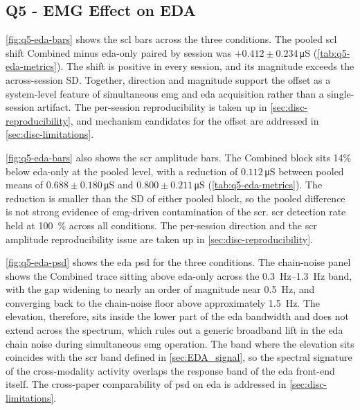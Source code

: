 \subsection{Q5 - EMG Effect on EDA}
\label{sec:disc-q5}

\autoref{fig:q5-eda-bars} shows the \gls{scl} bars across the three conditions. The pooled \gls{scl} shift Combined minus \gls{eda}-only paired by session was $+\num{0.412} \pm \num{0.234}$\,\si{\micro\siemens} (\autoref{tab:q5-eda-metrics}). The shift is positive in every session, and its magnitude exceeds the across-session SD. Together, direction and magnitude support the offset as a system-level feature of simultaneous \gls{emg} and \gls{eda} acquisition rather than a single-session artifact. The per-session reproducibility is taken up in \autoref{sec:disc-reproducibility}, and mechanism candidates for the offset are addressed in \autoref{sec:disc-limitations}.

\autoref{fig:q5-eda-bars} also shows the \gls{scr} amplitude bars. The Combined block sits 14\% below \gls{eda}-only at the pooled level, with a reduction of $\num{0.112}$\,\si{\micro\siemens} between pooled means of $\num{0.688} \pm \num{0.180}$\,\si{\micro\siemens} and $\num{0.800} \pm \num{0.211}$\,\si{\micro\siemens} (\autoref{tab:q5-eda-metrics}). The reduction is smaller than the SD of either pooled block, so the pooled difference is not strong evidence of \gls{emg}-driven contamination of the \gls{scr}. \gls{scr} detection rate held at \SI{100}{\percent} across all conditions. The per-session direction and the \gls{scr} amplitude reproducibility issue are taken up in \autoref{sec:disc-reproducibility}.

\autoref{fig:q5-eda-psd} shows the \gls{eda} \gls{psd} for the three conditions. The chain-noise panel shows the Combined trace sitting above \gls{eda}-only across the \SIrange{0.3}{1.3}{\hertz} band, with the gap widening to nearly an order of magnitude near \SI{0.5}{\hertz}, and converging back to the chain-noise floor above approximately \SI{1.5}{\hertz}. The elevation, therefore, sits inside the lower part of the \gls{eda} bandwidth and does not extend across the spectrum, which rules out a generic broadband lift in the \gls{eda} chain noise during simultaneous \gls{emg} operation. The band where the elevation sits coincides with the \gls{scr} band defined in \autoref{sec:EDA_signal}, so the spectral signature of the cross-modality activity overlaps the response band of the \gls{eda} front-end itself. The cross-paper comparability of \gls{psd} on \gls{eda} is addressed in \autoref{sec:disc-limitations}.

